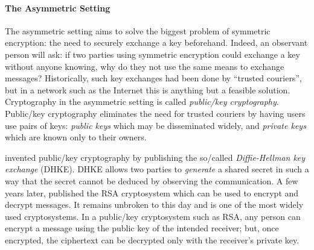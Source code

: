 \documentclass[version=last, paper=A4, parskip=half, oneside,%
toc=bibliography, toc=listof, listof=leveldown]{scrbook}
\theoremstyle{plain}
\theoremstyle{definition}
\theoremstyle{remark}
\newcommand*{\enc}{\ensuremath{\mathsf{Enc}}}
\newcommand*{\dec}{\ensuremath{\mathsf{Dec}}}
\begin{document}
\begin{figure}
  \centering
  \label{fig:symmetric-setting}
\end{figure}

\paragraph{The Asymmetric Setting} The asymmetric setting aims to solve the
biggest problem of symmetric encryption: the need to securely exchange a key
beforehand.  Indeed, an observant person will ask: if two parties using
symmetric encryption could exchange a key without anyone knowing, why do they
not use the same means to exchange messages?  Historically, such key exchanges
had been done by \enquote{trusted couriers}, but in a network such as the
Internet this is anything but a feasible solution.  Cryptography in the
asymmetric setting is called \emph{public\-/key cryptography}.  Public\-/key
cryptography eliminates the need for trusted couriers by having users use pairs
of keys: \emph{public keys} which may be disseminated widely, and \emph{private
  keys} which are known only to their owners.

\Textcite{DH76} invented public\-/key cryptography by publishing the so\-/called
\emph{Diffie\--Hellman key exchange} (DHKE).  DHKE allows two parties to
\emph{generate} a shared secret in such a way that the secret cannot be deduced
by observing the communication.  A few years later, \textcite{RSA78} published
the RSA cryptosystem which can be used to encrypt and decrypt messages.  It
remains unbroken to this day and is one of the most widely used cryptosystems.
In a public\-/key cryptosystem such as RSA, any person can encrypt a message
using the public key of the intended receiver; but, once encrypted, the
ciphertext can be decrypted only with the receiver's private key.
\end{document}
